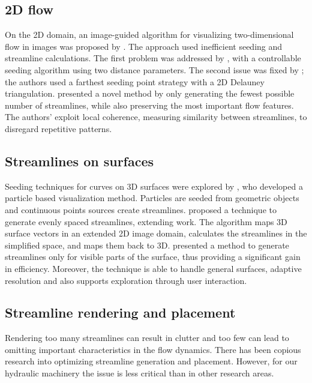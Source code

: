 \subsection{2D flow}

On the 2D domain, an image-guided algorithm for visualizing two-dimensional flow in images was proposed by \cite{Turk1996}.
The approach used inefficient seeding and streamline calculations.
The first problem was addressed by \cite{Jobard1997}, with a controllable seeding algorithm using two distance parameters.
The second issue was fixed by \cite{Mebarki2005}; the authors used a farthest seeding point strategy with a 2D Delauney triangulation.
\cite{Li2008} presented a novel method by only generating the fewest possible number of streamlines, while also preserving the most important flow features.
The authors' exploit local coherence,  measuring similarity between streamlines, to disregard repetitive patterns.

\subsection{Streamlines on surfaces}

Seeding techniques for curves on 3D surfaces were explored by \cite{VanWijk1992}, who developed a particle based visualization method.
Particles are seeded from geometric objects and continuous points sources create streamlines.
\cite{Mao1998} proposed a technique to generate evenly spaced streamlines, extending \cite{Turk1996} work.
The algorithm maps 3D surface vectors in an extended 2D image domain, calculates the streamlines in the simplified space, and maps them back to 3D. 
\cite{Spencer2009} presented a method to generate streamlines only for visible parts of the surface, thus providing a significant gain in efficiency.
Moreover, the technique is able to handle general surfaces, adaptive resolution and also supports exploration through user interaction.

\subsection{Streamline rendering and placement}

Rendering too many streamlines can result in clutter and too few can lead to omitting important characteristics in the flow dynamics.
There has been copious research into optimizing streamline generation and placement.
However, for our hydraulic machinery the issue is less critical than in other research areas.

